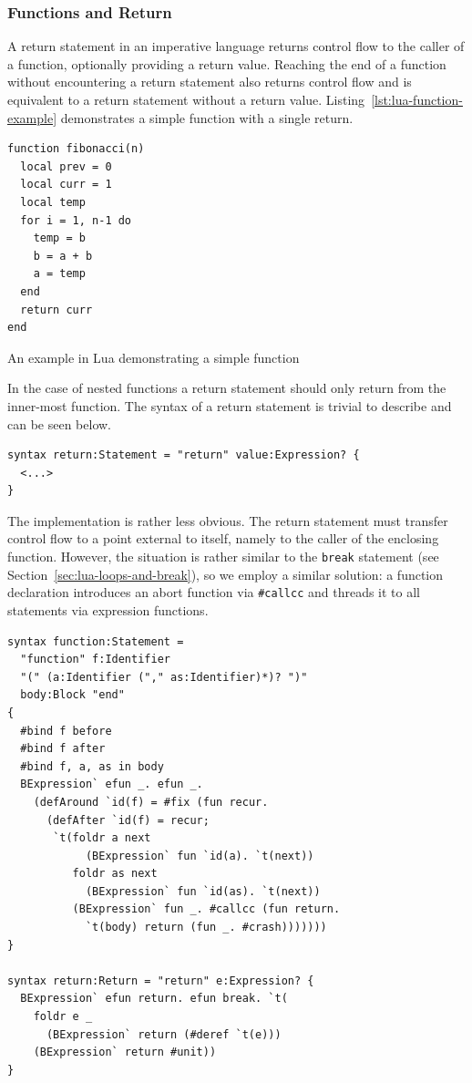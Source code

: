 \documentclass{kththesis}
\begin{document}
\subsubsection{Functions and Return}

A return statement in an imperative language returns control flow to the caller of a function, optionally providing a return value. Reaching the end of a function without encountering a return statement also returns control flow and is equivalent to a return statement without a return value. Listing~\ref{lst:lua-function-example} demonstrates a simple function with a single return.

\begin{listing}
\begin{verbatim}
function fibonacci(n)
  local prev = 0
  local curr = 1
  local temp
  for i = 1, n-1 do
    temp = b
    b = a + b
    a = temp
  end
  return curr
end
\end{verbatim}
\caption{An example in Lua demonstrating a simple function}
\label{lst:lua-function-example}
\end{listing}

In the case of nested functions a return statement should only return from the inner-most function. The syntax of a return statement is trivial to describe and can be seen below.

\begin{verbatim}
syntax return:Statement = "return" value:Expression? {
  <...>
}
\end{verbatim}

The implementation is rather less obvious. The return statement must transfer control flow to a point external to itself, namely to the caller of the enclosing function. However, the situation is rather similar to the \texttt{break} statement (see Section~\ref{sec:lua-loops-and-break}), so we employ a similar solution: a function declaration introduces an abort function via \texttt{#callcc} and threads it to all statements via expression functions.

\begin{verbatim}
syntax function:Statement =
  "function" f:Identifier
  "(" (a:Identifier ("," as:Identifier)*)? ")"
  body:Block "end"
{
  #bind f before
  #bind f after
  #bind f, a, as in body
  BExpression` efun _. efun _.
    (defAround `id(f) = #fix (fun recur.
      (defAfter `id(f) = recur;
       `t(foldr a next
            (BExpression` fun `id(a). `t(next))
          foldr as next
            (BExpression` fun `id(as). `t(next))
          (BExpression` fun _. #callcc (fun return.
            `t(body) return (fun _. #crash)))))))
}

syntax return:Return = "return" e:Expression? {
  BExpression` efun return. efun break. `t(
    foldr e _
      (BExpression` return (#deref `t(e)))
    (BExpression` return #unit))
}
\end{verbatim}
\end{document}
